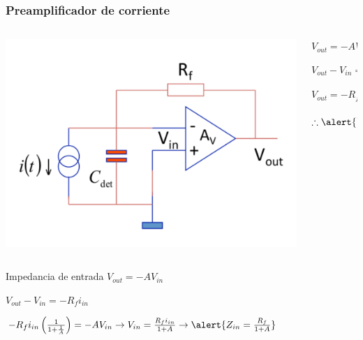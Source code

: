 \documentclass{beamer}
\begin{document}
\begin{frame}
\frametitle{Preamplificador de corriente}
\begin{columns}
\begin{column}{0.5\textwidth}
\includegraphics[width=\textwidth]{d2/current_preamplifier_zin}
\end{column}
\begin{column}{0.5\textwidth}
\begin{center}
$V_{out} = -AV_{in}$

$V_{out} - V_{in} = -R_f i_{in}$

$V_{out} = -R_f i_{in}\left(\frac{1}{1+\frac{1}{A}}\right)$

\vspace{7mm}
$\therefore \alert{V_{out} \approx -R_f i_{in}}$
\end{center}
\end{column}
\end{columns}
\begin{block}{Impedancia de entrada}
$V_{out} = -AV_{in}$

$V_{out} - V_{in} = -R_f i_{in}$

$-R_f i_{in} \left(\frac{1}{1+\frac{1}{A}}\right) = -AV_{in} \rightarrow  V_{in}
= \frac{R_f i_{in}}{1 + A} \rightarrow \alert{Z_{in} =
\frac{R_f}{1 + A}}$
\end{block}
\end{frame}
\end{document}
